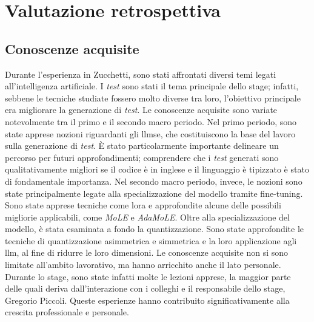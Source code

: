 \chapter{Valutazione retrospettiva}
\label{chap:conclusioni}
    \section{Conoscenze acquisite}
    Durante l’esperienza in Zucchetti, sono stati affrontati diversi temi legati all'intelligenza artificiale. I \textit{test} sono stati il tema principale dello stage; infatti, sebbene le tecniche studiate fossero molto diverse tra loro, l'obiettivo principale era migliorare la generazione di \textit{test}.
    Le conoscenze acquisite sono variate notevolmente tra il primo e il secondo macro periodo. Nel primo periodo, sono state apprese nozioni riguardanti gli \gls{llmse}, che costituiscono la base del lavoro sulla generazione di \textit{test}. È stato particolarmente importante delineare un percorso per futuri approfondimenti; comprendere che i \textit{test} generati sono qualitativamente migliori se il codice è in inglese e il linguaggio è tipizzato è stato di fondamentale importanza.
    Nel secondo macro periodo, invece, le nozioni sono state principalmente legate alla specializzazione del modello tramite \gls{fine-tuning}. Sono state apprese tecniche come \gls{lora} e approfondite alcune delle possibili migliorie applicabili, come \textit{MoLE} e \textit{AdaMoLE}.
    Oltre alla specializzazione del modello, è stata esaminata a fondo la quantizzazione. Sono state approfondite le tecniche di quantizzazione asimmetrica e simmetrica e la loro applicazione agli \gls{llm}, al fine di ridurre le loro dimensioni.    
    Le conoscenze acquisite non si sono limitate all'ambito lavorativo, ma hanno arricchito anche il lato personale. Durante lo stage, sono state infatti molte le lezioni apprese, la maggior parte delle quali deriva dall'interazione con i colleghi e il responsabile dello stage, Gregorio Piccoli. Queste esperienze hanno contribuito significativamente alla crescita professionale e personale.
